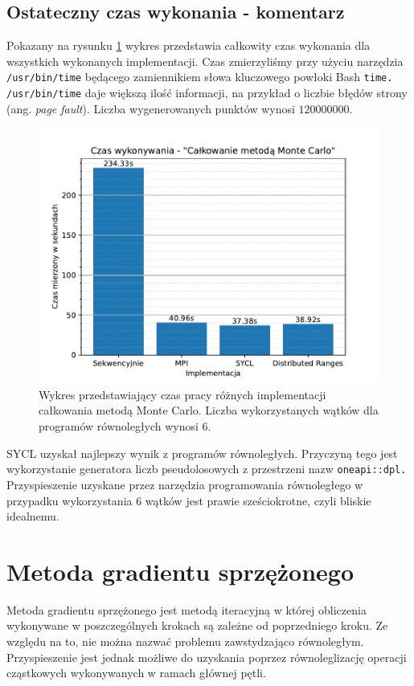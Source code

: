 \documentclass[a4paper,12pt]{book} %
\begin{document}
\subsection{Ostateczny czas wykonania - komentarz}
Pokazany na rysunku \ref{fig:wykonanie-MC} wykres przedstawia całkowity czas wykonania dla wszystkich wykonanych implementacji. Czas zmierzyliśmy przy użyciu narzędzia \texttt{/usr/bin/time} będącego zamiennikiem słowa kluczowego powłoki Bash \texttt{time.} \texttt{/usr/bin/time} daje większą ilość informacji, na przykład o liczbie błędów strony (ang. \emph{page fault}). Liczba wygenerowanych punktów wynosi $120000000.$

\begin{figure}
	\centering
	\includegraphics[scale=1]{assets/czas_wykonania_calkowanie.pdf}
	\caption{Wykres przedstawiający czas pracy różnych implementacji całkowania metodą Monte Carlo. Liczba wykorzystanych wątków dla programów równoległych wynosi 6.}
	\label{fig:wykonanie-MC}
\end{figure}

SYCL uzyskał najlepszy wynik z programów równoległych. Przyczyną tego jest wykorzystanie generatora liczb pseudolosowych z przestrzeni nazw \texttt{oneapi::dpl.} Przyspieszenie uzyskane przez narzędzia programowania równoległego w przypadku wykorzystania 6 wątków jest prawie sześciokrotne, czyli bliskie idealnemu.

\section{Metoda gradientu sprzężonego}
Metoda gradientu sprzężonego jest metodą iteracyjną w której obliczenia wykonywane w poszczególnych krokach są zależne od poprzedniego kroku. Ze względu na to, nie można nazwać problemu zawstydzająco równoległym. Przyspieszenie jest jednak możliwe do uzyskania poprzez równoleglizację operacji cząstkowych wykonywanych w ramach głównej pętli.
\end{document}
